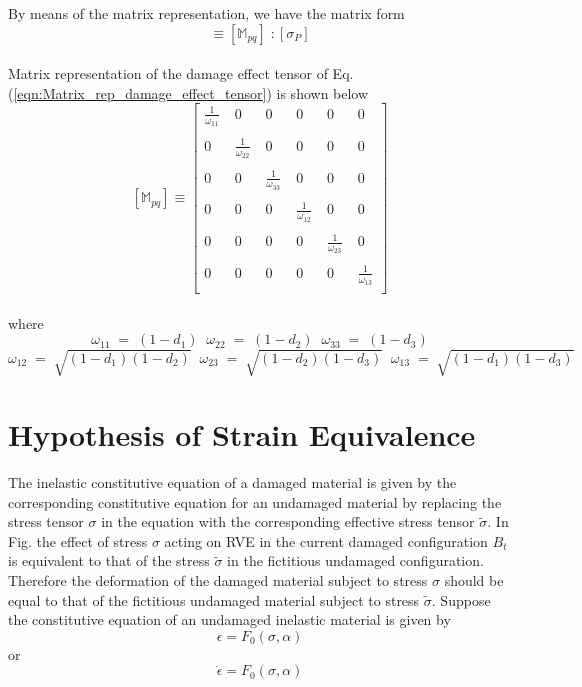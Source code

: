 \documentclass[a4paper,12pt,twoside]{report}
\begin{document}
By means of the matrix representation, we have the matrix form
\begin{equation}
[\tilde{\sigma_{P}}] \equiv [\mathbb{M}_{pq}]\;: [\sigma_{P}]
\label{eqn:Matrix_rep_damage_effect_tensor}
\end{equation}
\\
Matrix representation of the damage effect tensor of Eq.(\ref{eqn:Matrix_rep_damage_effect_tensor}) is shown below
\\
$$
[\mathbb{M}_{pq}] \equiv   
 \begin{bmatrix}
   \frac{1}{\omega_{11}}  \; & 0 \; & 0 \; & 0 \; & 0\; & 0 \\
  \\
  0\; & \frac{1}{\omega_{22}}\; & 0\; & 0\; & 0\; & 0 \\
  \\
  0\; & 0 \; & \frac{1}{\omega_{33}}\; & 0\; & 0\; & 0 \\
  \\
  0\; & 0\; & 0\; & \frac{1}{\omega_{12}}\; & 0\; & 0 \\
  \\
  0\; & 0\; & 0\; & 0\; & \frac{1}{\omega_{23}}\; & 0 \\
  \\
  0\; & 0\; & 0\; & 0\; & 0\; & \frac{1}{\omega_{13}}  
  \\
 \end{bmatrix}
 \label{Damage_effect_tensor}
 $$
\\
where
$$\omega_{11} \; = \; (1 - d_{1}) \;\;  \omega_{22} \; = \; (1 - d_{2}) \;\; \omega_{33} \; = \; (1 - d_{3})$$ \vspace*{0.1cm} $$\omega_{12} \; = \; \sqrt{(1 - d_{1})(1 - d_{2})}  \;\;\omega_{23} \; = \; \sqrt{(1 - d_{2})(1 - d_{3})} \;\; \omega_{13} \; = \; \sqrt{(1 - d_{1})(1 - d_{3})}$$

\section{Hypothesis of Strain Equivalence}\label{Hypothesis of Strain Equivalence}

\indent\indent\indent The inelastic constitutive equation of a damaged material is given by the corresponding constitutive equation for an undamaged material by replacing the stress tensor $\sigma$ in the equation with the corresponding effective stress tensor $\tilde{\sigma}$. In Fig. the effect of stress $\sigma$ acting on RVE in the current damaged configuration $B_{t}$ is equivalent to that of the stress $\tilde{\sigma}$ in the fictitious undamaged configuration. Therefore the deformation of the damaged material subject to stress $\sigma$ should be equal to that of the fictitious undamaged material subject to stress $\tilde{\sigma}$. Suppose the constitutive equation of an undamaged inelastic material is given by
\begin{equation}
  \epsilon = F_{0}(\sigma, \alpha)
\end{equation} 
or
\begin{equation}
  \dot{\epsilon} = F_{0}(\sigma, \alpha)
\end{equation}
\end{document}

